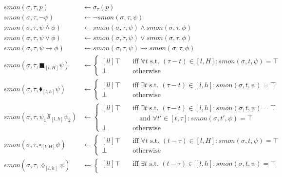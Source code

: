 \documentclass[10pt,a4paper]{article}
\newcommand{\smon}[1]{\ensuremath{smon(\sigma, \tau, #1)}}
\begin{document}
\[ 
\begin{aligned}
\smon{p} & \leftarrow \sigma_{\tau} ( p ) \\
\smon{\neg \psi} & \leftarrow \neg \smon{\psi} \\
\smon{\psi \wedge \phi} & \leftarrow \smon{\psi} \wedge \smon{\phi} \\
\smon{\psi \vee \phi} & \leftarrow \smon{\psi} \vee  \smon{\phi} \\
\smon{\psi \rightarrow \phi} & \leftarrow \smon{\psi} \rightarrow \smon{\phi} \\
\smon{\blacksquare_{[l,H]}\psi} & \leftarrow \left\lbrace
\begin{aligned}[l l]
	\top & \quad \text{iff } \forall t \text{ s.t. } (\tau - t) \in [l, H]: smon(\sigma, t, \psi) = \top \\
	\perp & \quad \text{otherwise}
\end{aligned} \right. \\
\smon{\blacklozenge_{[l,h]}\psi} & \leftarrow \left\lbrace
\begin{aligned}[l l]
	\top & \quad \text{iff } \exists t \text{ s.t. } (\tau - t) \in [l, h]: smon(\sigma, t, \psi) = \top \\
	\perp & \quad \text{otherwise}
\end{aligned} \right. \\
\smon{\psi_1 \mathcal{S}_{[l,h]} \psi_2} & \leftarrow \left\lbrace
\begin{aligned}[l l]
	\top & \quad \text{iff } \exists t \text{ s.t. } (\tau - t) \in [l, h]: smon(\sigma, t, \psi) = \top \\
	& \quad \quad \text{and } \forall t' \in [t, \tau]: smon(\sigma, t', \psi) = \top \\
	\perp & \quad \text{otherwise}
\end{aligned} \right. \\
\smon{\square_{[l,H]} \psi} & \leftarrow \left\lbrace
\begin{aligned}[l l]
	\top & \quad \text{iff } \forall t \text{ s.t. } (t - \tau) \in [l, H]: smon(\sigma, t, \psi) = \top \\
	\perp & \quad \text{otherwise}
\end{aligned} \right. \\
\smon{\lozenge_{[l,h]} \psi} & \leftarrow \left\lbrace
\begin{aligned}[l l]
	\top & \quad \text{iff } \exists t \text{ s.t. } (t - \tau) \in [l, h]: smon(\sigma, t, \psi) = \top \\

\end{aligned}
\end{aligned}\]
\end{document}
